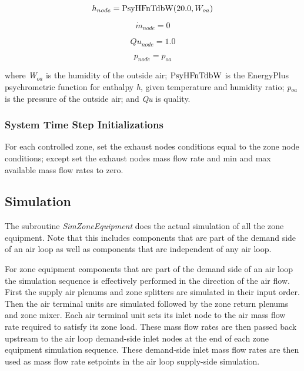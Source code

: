 \begin{equation}
{h_{node}} = {\mathop{\rm PsyHFnTdbW}\nolimits} {\rm{(}}20.0,{W_{oa}}{\rm{)}}
\end{equation}

\begin{equation}
{\dot m_{node}} = 0
\end{equation}

\begin{equation}
Q{u_{node}} = 1.0
\end{equation}

\begin{equation}
{p_{node}} = {p_{oa}}
\end{equation}

where \emph{W\(_{oa}\)} is the humidity of the outside air; \({\rm{PsyHFnTdbW}}\) is the EnergyPlus psychrometric function for enthalpy \emph{h}, given temperature and humidity ratio; \emph{p\(_{oa}\)} is the pressure of the outside air; and \emph{Qu} is quality.

\subsubsection{System Time Step Initializations}\label{system-time-step-initializations-000}

For each controlled zone, set the exhaust nodes conditions equal to the zone node conditions; except set the exhaust nodes mass flow rate and min and max available mass flow rates to zero.

\subsection{Simulation}\label{simulation-003}

The subroutine \emph{SimZoneEquipment} does the actual simulation of all the zone equipment. Note that this includes components that are part of the demand side of an air loop as well as components that are independent of any air loop.

For zone equipment components that are part of the demand side of an air loop the simulation sequence is effectively performed in the direction of the air flow. First the supply air plenums and zone splitters are simulated in their input order. Then the air terminal units are simulated followed by the zone return plenums and zone mixer. Each air terminal unit sets its inlet node to the air mass flow rate required to satisfy its zone load. These mass flow rates are then passed back upstream to the air loop demand-side inlet nodes at the end of each zone equipment simulation sequence. These demand-side inlet mass flow rates are then used as mass flow rate setpoints in the air loop supply-side simulation.

